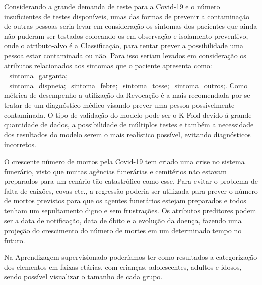 \documentclass[12pt]{article}
\begin{document}
Considerando a grande demanda de teste para a Covid-19 e o número insuficientes de testes disponíveis, umas das formas de prevenir a contaminação de outras pessoas seria levar em consideração os sintomas dos pacientes que ainda não puderam ser testados colocando-os em observação e isolamento preventivo, onde o atributo-alvo é a Classificação, para tentar prever a possibilidade uma pessoa estar contaminada ou não. Para isso seriam levados em consideração os atributos relacionados aos sintomas que o paciente apresenta como: \_sintoma\_garganta; \_sintoma\_dispneia;\_sintoma\_febre;\_sintoma\_tosse;\_sintoma\_outros;. Como métrica de desempenho a utilização da Revocação é a mais recomendada por se tratar de um diagnóstico médico visando prever uma pessoa possivelmente contaminada. O tipo de validação do modelo pode ser o K-Fold devido á grande quantidade de dados, a possibilidade de múltiplos testes e também a necessidade dos resultados do modelo serem o mais realístico possível, evitando diagnósticos incorretos.

O crescente número de mortos pela Covid-19 tem criado uma crise no sistema funerário, visto que muitas agências funerárias e cemitérios não estavam preparados para um cenário tão catastrófico como esse. Para evitar o problema de falta de caixões, covas etc., a regressão poderia ser utilizada para prever o número de mortos previstos para que os agentes funerários estejam preparados e todos tenham um sepultamento digno e sem frustrações. Os atributos preditores podem ser a data de notificação, data de óbito e a evolução da doença, fazendo uma projeção do crescimento do número de mortes em um determinado tempo no futuro.


Na Aprendizagem supervisionado poderíamos ter como resultados a categorização dos elementos em faixas etárias, com crianças, adolescentes, adultos e idosos, sendo possível visualizar o tamanho de cada grupo.

%
%
\end{document}
